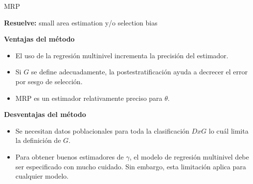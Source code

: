 \documentclass[ignorenonframetext,]{beamer}
\begin{document}
\begin{frame}{MRP}

\textbf{Resuelve:} small area estimation y/o selection bias

\textbf{Ventajas del método}

\begin{itemize}
\itemsep1pt\parskip0pt
\item
  El uso de la regresión multinivel incrementa la precisión del
  estimador.
\item
  Si $G$ se define adecuadamente, la postestratificación ayuda a
  decrecer el error por sesgo de selección.
\item
  MRP es un estimador relativamente preciso para $\theta$.
\end{itemize}

\textbf{Desventajas del método}

\begin{itemize}
\itemsep1pt\parskip0pt
\item
  Se necesitan datos poblacionales para toda la clasificación $DxG$ lo
  cuál limita la definición de $G$.
\item
  Para obtener buenos estimadores de $\gamma$, el modelo de regresión
  multinivel debe ser especificado con mucho cuidado. Sin embargo, esta
  limitación aplica para cualquier modelo.
\end{itemize}

\end{frame}
\end{document}
